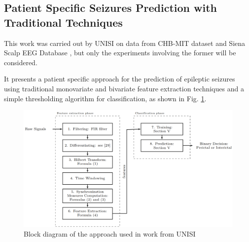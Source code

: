\subsection{Patient Specific Seizures Prediction with Traditional Techniques} \label{subsec:refwork-siena}
This work was carried out by \gls{UNISI} \cite{detti_patient-specific_2019, detti_paolo_siena_2020} on data from \gls{CHB-MIT} dataset and Siena Scalp \gls{EEG} Database \cite{detti_eeg_2020, detti_paolo_siena_2020}, but only the experiments involving the former will be considered.

It presents a patient specific approach for the prediction of epileptic seizures using traditional monovariate and bivariate feature extraction techniques and a simple thresholding algorithm for classification, as shown in Fig. \ref{fig:siena-feature-extraction}.

\begin{figure}[ht]
    \centering
    \includegraphics[width=1.0\textwidth]{images/State-of-art/siena-feature-extraction.png}
    \caption{Block diagram of the approach used in work from \gls{UNISI} \cite{detti_patient-specific_2019}}
    \label{fig:siena-feature-extraction}
\end{figure}


